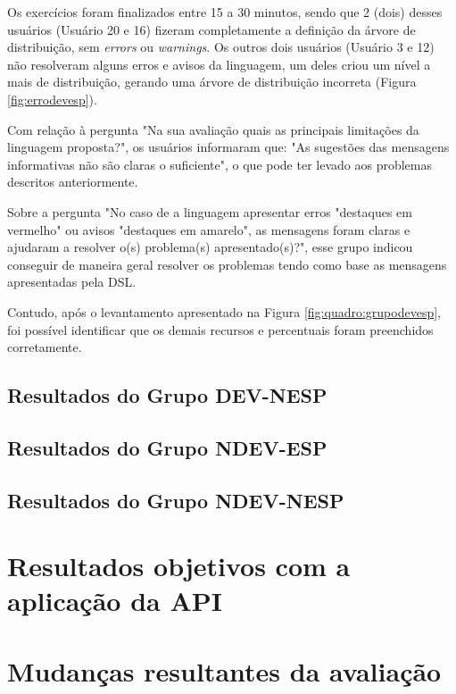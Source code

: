 Os exercícios foram finalizados entre 15 a 30 minutos, sendo que 2 (dois) desses usuários (Usuário 20 e 16) fizeram completamente a definição da árvore de distribuição, sem \textit{errors} ou \textit{warnings}. Os outros dois usuários (Usuário 3 e 12) não resolveram alguns erros e avisos da linguagem, um deles criou um nível a mais de distribuição, gerando uma árvore de distribuição incorreta (Figura \ref{fig:errodevesp}). 



\newpage



Com relação à pergunta "Na sua avaliação quais as principais limitações da linguagem proposta?", os usuários informaram que: "As sugestões das mensagens informativas não são claras o suficiente", o que pode ter levado aos problemas descritos anteriormente.

Sobre a pergunta "No caso de a linguagem apresentar erros "destaques em vermelho" ou avisos "destaques em amarelo", as mensagens foram claras e ajudaram a resolver o(s) problema(s) apresentado(s)?", esse grupo indicou conseguir de maneira geral resolver os problemas tendo como base as mensagens apresentadas pela DSL.

Contudo, após o levantamento apresentado na Figura \ref{fig:quadro:grupodevesp}, foi possível identificar que os demais recursos e percentuais foram preenchidos corretamente. 

\newpage
\subsection{Resultados do Grupo DEV-NESP}
\label{subsec:devesp}

\subsection{Resultados do Grupo NDEV-ESP}
\label{subsec:devesp}

\subsection{Resultados do Grupo NDEV-NESP}
\label{subsec:devesp}


\section{Resultados objetivos com a aplicação da API}
\label{sec:avaliacaoapi}


\section{Mudanças resultantes da avaliação}
\label{sec:mudanasresultantes}